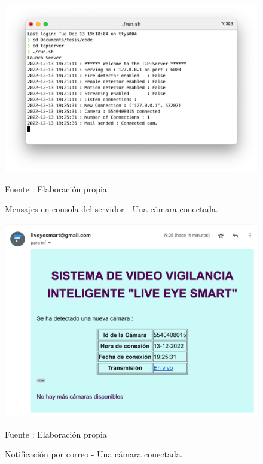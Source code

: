 \begin{figure}[H]
    \begin{center}
        \includegraphics[width=13cm]{img/capitulo_6/server_cam_connected.png}
        \caption{Mensajes en consola del servidor - Una cámara conectada.}
        Fuente : Elaboración propia
    \end{center}
\end{figure}

\begin{figure}[H]
    \begin{center}
        \includegraphics[width=13cm]{img/capitulo_6/mail1.png}
        \caption{Notificación por correo - Una cámara conectada.}
        Fuente : Elaboración propia
    \end{center}
\end{figure}


